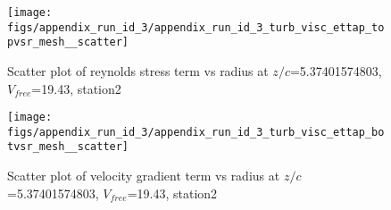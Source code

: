 \begin{figure}[H]
\centering
\texttt{[image: figs/appendix\_run\_id\_3/appendix\_run\_id\_3\_turb\_visc\_ettap\_topvsr\_mesh\_\_scatter]}
\caption{Scatter plot of reynolds stress term vs radius at $z/c$=5.37401574803, $V_{free}$=19.43, station2}
\label{fig:appendix_run_id_3_turb_visc_ettap_topvsr_mesh__scatter}
\end{figure}


\begin{figure}[H]
\centering
\texttt{[image: figs/appendix\_run\_id\_3/appendix\_run\_id\_3\_turb\_visc\_ettap\_botvsr\_mesh\_\_scatter]}
\caption{Scatter plot of velocity gradient term vs radius at $z/c$=5.37401574803, $V_{free}$=19.43, station2}
\label{fig:appendix_run_id_3_turb_visc_ettap_botvsr_mesh__scatter}
\end{figure}


